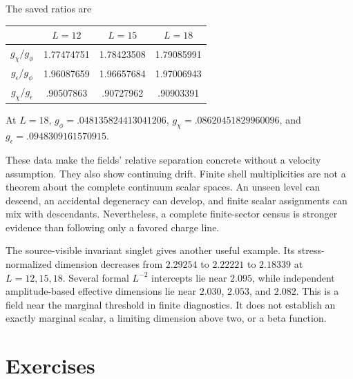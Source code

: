 \begin{numericalrecord}
The saved ratios are
\begin{center}
\begin{tabular}{c c c c}
 & $L=12$ & $L=15$ & $L=18$\\\hline
$g_\chi/g_\phi$&1.77474751&1.78423508&1.79085991\\
$g_\epsilon/g_\phi$&1.96087659&1.96657684&1.97006943\\
$g_\chi/g_\epsilon$&.90507863&.90727962&.90903391
\end{tabular}
\end{center}
At $L=18$, $g_\phi=.048135824413041206$,
$g_\chi=.08620451829960096$, and
$g_\epsilon=.0948309161570915$.
\end{numericalrecord}

These data make the fields' relative separation concrete without a
velocity assumption. They also show continuing drift. Finite shell
multiplicities are not a theorem about the complete continuum scalar
spaces. An unseen level can descend, an accidental degeneracy can
develop, and finite scalar assignments can mix with descendants.
Nevertheless, a complete finite-sector census is stronger evidence
than following only a favored charge line.

The source-visible invariant singlet gives another useful example. Its
stress-normalized dimension decreases from $2.29254$ to $2.22221$ to
$2.18339$ at $L=12,15,18$. Several formal $L^{-2}$ intercepts lie near
$2.095$, while independent amplitude-based effective dimensions lie
near $2.030$, $2.053$, and $2.082$. This is a field near the marginal
threshold in finite diagnostics. It does not establish an exactly
marginal scalar, a limiting dimension above two, or a beta function.

\section{Exercises}

